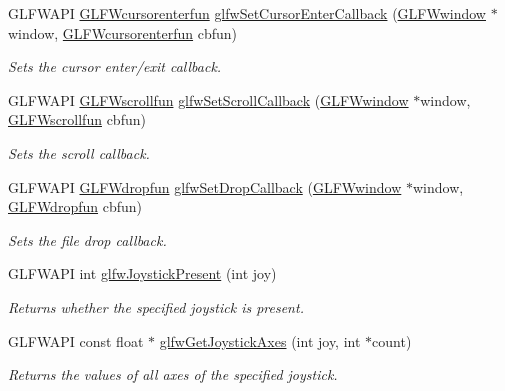 \begin{DoxyCompactItemize}
G\+L\+F\+W\+A\+P\+I \hyperlink{group__input_ga51ab436c41eeaed6db5a0c9403b1c840}{G\+L\+F\+Wcursorenterfun} \hyperlink{group__input_gaa20014985561efeb2c53f1956f727830}{glfw\+Set\+Cursor\+Enter\+Callback} (\hyperlink{group__window_ga3c96d80d363e67d13a41b5d1821f3242}{G\+L\+F\+Wwindow} $\ast$window, \hyperlink{group__input_ga51ab436c41eeaed6db5a0c9403b1c840}{G\+L\+F\+Wcursorenterfun} cbfun)
\begin{DoxyCompactList}\small\item\em Sets the cursor enter/exit callback. \end{DoxyCompactList}\item 
G\+L\+F\+W\+A\+P\+I \hyperlink{group__input_ga4687e2199c60a18a8dd1da532e6d75c9}{G\+L\+F\+Wscrollfun} \hyperlink{group__input_ga29011514e93368712a3063a28707ced3}{glfw\+Set\+Scroll\+Callback} (\hyperlink{group__window_ga3c96d80d363e67d13a41b5d1821f3242}{G\+L\+F\+Wwindow} $\ast$window, \hyperlink{group__input_ga4687e2199c60a18a8dd1da532e6d75c9}{G\+L\+F\+Wscrollfun} cbfun)
\begin{DoxyCompactList}\small\item\em Sets the scroll callback. \end{DoxyCompactList}\item 
G\+L\+F\+W\+A\+P\+I \hyperlink{group__input_gab71f4ca80b651462852e601caf308c4a}{G\+L\+F\+Wdropfun} \hyperlink{group__input_gad4fc40df63a5d0441ab06de9a585cc04}{glfw\+Set\+Drop\+Callback} (\hyperlink{group__window_ga3c96d80d363e67d13a41b5d1821f3242}{G\+L\+F\+Wwindow} $\ast$window, \hyperlink{group__input_gab71f4ca80b651462852e601caf308c4a}{G\+L\+F\+Wdropfun} cbfun)
\begin{DoxyCompactList}\small\item\em Sets the file drop callback. \end{DoxyCompactList}\item 
G\+L\+F\+W\+A\+P\+I int \hyperlink{group__input_ga7f81f22f355f4b7d315caf73cdfd9906}{glfw\+Joystick\+Present} (int joy)
\begin{DoxyCompactList}\small\item\em Returns whether the specified joystick is present. \end{DoxyCompactList}\item 
G\+L\+F\+W\+A\+P\+I const float $\ast$ \hyperlink{group__input_gaab9e573d808b088c5079c0f577d39448}{glfw\+Get\+Joystick\+Axes} (int joy, int $\ast$count)
\begin{DoxyCompactList}\small\item\em Returns the values of all axes of the specified joystick. \end{DoxyCompactList}\item 

\end{DoxyCompactItemize}
